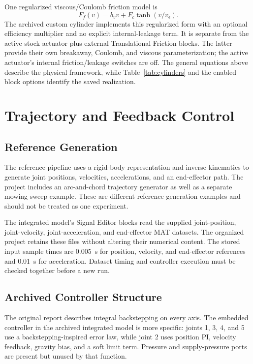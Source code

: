 \documentclass[conference,letterpaper]{IEEEtran}
\begin{document}
One regularized viscous/Coulomb friction model is
\begin{equation}
F_f(v)=b_vv+F_c\tanh(v/v_\epsilon).
\end{equation}
The archived custom cylinder implements this regularized form with an optional efficiency multiplier and no explicit internal-leakage term. It is separate from the active stock actuator plus external Translational Friction blocks. The latter provide their own breakaway, Coulomb, and viscous parameterization; the active actuator's internal friction/leakage switches are off. The general equations above describe the physical framework, while Table~\ref{tab:cylinders} and the enabled block options identify the saved realization.

\section{Trajectory and Feedback Control}
\subsection{Reference Generation}
The reference pipeline uses a rigid-body representation and inverse kinematics to generate joint positions, velocities, accelerations, and an end-effector path. The project includes an arc-and-chord trajectory generator as well as a separate mowing-sweep example. These are different reference-generation examples and should not be treated as one experiment.

The integrated model's Signal Editor blocks read the supplied joint-position, joint-velocity, joint-acceleration, and end-effector MAT datasets. The organized project retains these files without altering their numerical content. The stored input sample times are 0.005~s for position, velocity, and end-effector references and 0.01~s for acceleration. Dataset timing and controller execution must be checked together before a new run.

\subsection{Archived Controller Structure}
The original report describes integral backstepping on every axis. The embedded controller in the archived integrated model is more specific: joints 1, 3, 4, and 5 use a backstepping-inspired error law, while joint 2 uses position PI, velocity feedback, gravity bias, and a soft limit term. Pressure and supply-pressure ports are present but unused by that function.
\end{document}
